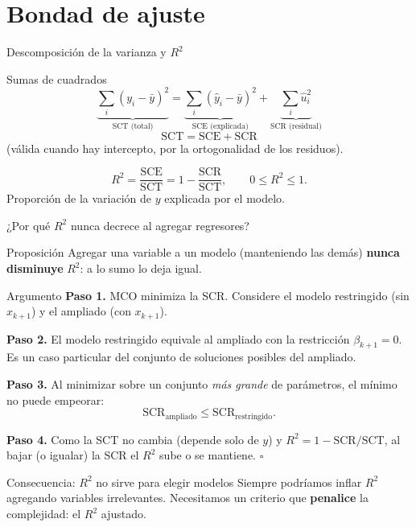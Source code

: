 \documentclass{beamer}
\begin{document}
\section{Bondad de ajuste}

\begin{frame}{Descomposición de la varianza y $R^2$}

\begin{block}{Sumas de cuadrados}
\[
\underbrace{\sum_i (y_i-\bar{y})^2}_{\text{SCT (total)}} =
\underbrace{\sum_i (\hat{y}_i-\bar{y})^2}_{\text{SCE (explicada)}} +
\underbrace{\sum_i \hat{u}_i^2}_{\text{SCR (residual)}}
\]
\[
\text{SCT} = \text{SCE} + \text{SCR}
\]
(válida cuando hay intercepto, por la ortogonalidad de los residuos).
\end{block}

\pause

\begin{tcolorbox}[colback=blue!5!white, colframe=blue!75!black, title=Coeficiente de determinación]
\[
R^2 = \frac{\text{SCE}}{\text{SCT}} = 1 - \frac{\text{SCR}}{\text{SCT}}, \qquad 0 \le R^2 \le 1.
\]
Proporción de la variación de $y$ explicada por el modelo.
\end{tcolorbox}
\end{frame}

\begin{frame}[allowframebreaks]{¿Por qué $R^2$ nunca decrece al agregar regresores?}

\begin{alertblock}{Proposición}
Agregar una variable a un modelo (manteniendo las demás) \textbf{nunca disminuye} $R^2$: a lo sumo lo deja igual.
\end{alertblock}

\begin{exampleblock}{Argumento}
\textbf{Paso 1.} MCO minimiza la SCR. Considere el modelo restringido (sin $x_{k+1}$) y el ampliado (con $x_{k+1}$).

\textbf{Paso 2.} El modelo restringido equivale al ampliado con la restricción $\beta_{k+1}=0$. Es un caso particular del conjunto de soluciones posibles del ampliado.

\textbf{Paso 3.} Al minimizar sobre un conjunto \emph{más grande} de parámetros, el mínimo no puede empeorar:
\[
\text{SCR}_{\text{ampliado}} \le \text{SCR}_{\text{restringido}}.
\]
\framebreak

\textbf{Paso 4.} Como la SCT no cambia (depende solo de $y$) y $R^2 = 1 - \text{SCR}/\text{SCT}$, al bajar (o igualar) la SCR el $R^2$ \alert{sube o se mantiene}. \hfill $\square$
\end{exampleblock}

\begin{block}{Consecuencia: $R^2$ no sirve para elegir modelos}
Siempre podríamos inflar $R^2$ agregando variables irrelevantes. Necesitamos un criterio que \textbf{penalice} la complejidad: el $R^2$ ajustado.
\end{block}

\end{frame}
\end{document}
